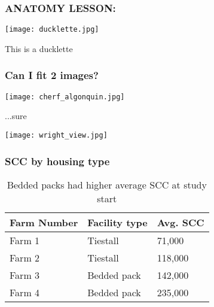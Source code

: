 \documentclass[12pt]{beamer}
\begin{document}
\begin{frame}
\frametitle{ANATOMY LESSON:}
   \texttt{[image: ducklette.jpg]}
   \caption{This is a ducklette}
\end{frame}

\begin{frame}
\frametitle{Can I fit 2 images?}
   \texttt{[image: cherf\_algonquin.jpg]}
   \caption{...sure}
   \hfill
   \texttt{[image: wright\_view.jpg]}
\end{frame}




\begin{frame}
\frametitle{SCC by housing type}
\begin{table}
\begin{tabular}{l l l}
\toprule
\textbf{Farm Number} & \textbf{Facility type} & \textbf{Avg. SCC}\\
\midrule
Farm 1 & Tiestall & 71,000 \\
Farm 2 & Tiestall & 118,000 \\
Farm 3 & Bedded pack & 142,000 \\
Farm 4 & Bedded pack & 235,000 \\
\bottomrule
\end{tabular}
\caption{Bedded packs had higher average SCC at study start}
\end{table}
\end{frame}

\end{document}
